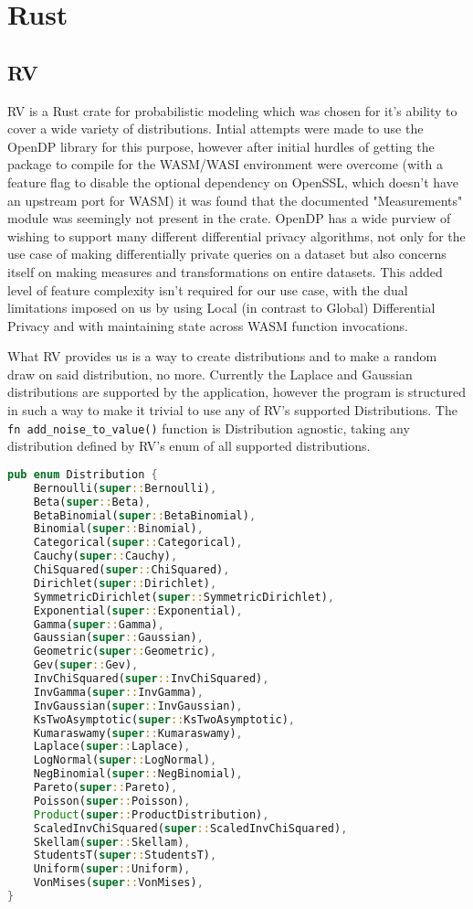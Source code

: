 \section{Rust}
\subsection{RV}
RV is a Rust crate for probabilistic modeling which was chosen for it's ability to cover a wide variety of distributions. Intial attempts were made to use the OpenDP library for this purpose, however after initial hurdles of getting the package to compile for the WASM/WASI environment were overcome (with a feature flag to disable the optional dependency on OpenSSL, which doesn't have an upstream port for WASM) it was found that the documented "Measurements" module was seemingly not present in the crate. OpenDP has a wide purview of wishing to support many different differential privacy algorithms, not only for the use case of making differentially private queries on a dataset but also concerns itself on making measures and transformations on entire datasets. This added level of feature complexity isn't required for our use case, with the dual limitations imposed on us by using Local (in contrast to Global) Differential Privacy and with maintaining state across WASM function invocations.   

What RV provides us is a way to create distributions and to make a random draw on said distribution, no more. Currently the Laplace and Gaussian distributions are supported by the application, however the program is structured in such a way to make it trivial to use any of RV's supported Distributions. The \texttt{fn add\_noise\_to\_value()} function is Distribution agnostic, taking any distribution defined by RV's enum of all supported distributions.

\begin{lstlisting}[language=Rust, caption={Enum from rv::dist::distribution}, label={rv-enum}]
pub enum Distribution {
    Bernoulli(super::Bernoulli),
    Beta(super::Beta),
    BetaBinomial(super::BetaBinomial),
    Binomial(super::Binomial),
    Categorical(super::Categorical),
    Cauchy(super::Cauchy),
    ChiSquared(super::ChiSquared),
    Dirichlet(super::Dirichlet),
    SymmetricDirichlet(super::SymmetricDirichlet),
    Exponential(super::Exponential),
    Gamma(super::Gamma),
    Gaussian(super::Gaussian),
    Geometric(super::Geometric),
    Gev(super::Gev),
    InvChiSquared(super::InvChiSquared),
    InvGamma(super::InvGamma),
    InvGaussian(super::InvGaussian),
    KsTwoAsymptotic(super::KsTwoAsymptotic),
    Kumaraswamy(super::Kumaraswamy),
    Laplace(super::Laplace),
    LogNormal(super::LogNormal),
    NegBinomial(super::NegBinomial),
    Pareto(super::Pareto),
    Poisson(super::Poisson),
    Product(super::ProductDistribution),
    ScaledInvChiSquared(super::ScaledInvChiSquared),
    Skellam(super::Skellam),
    StudentsT(super::StudentsT),
    Uniform(super::Uniform),
    VonMises(super::VonMises),
}
\end{lstlisting}

